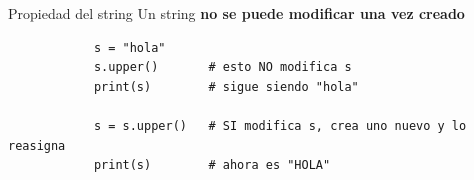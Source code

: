 \documentclass{beamer}
\begin{document}

        

    \begin{frame}[fragile,t]{Propiedad del string}
        Un string \textbf{no se puede modificar una vez creado}
        \begin{verbatim}
            s = "hola"
            s.upper()       # esto NO modifica s
            print(s)        # sigue siendo "hola"
            
            s = s.upper()   # SI modifica s, crea uno nuevo y lo reasigna
            print(s)        # ahora es "HOLA"
        \end{verbatim}
    \end{frame}
\end{document}
